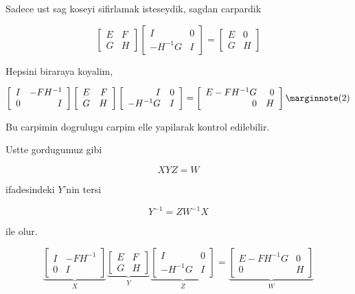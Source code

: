 \documentclass[12pt,fleqn]{article}\usepackage{../common}
\begin{document}
Sadece ust sag koseyi sifirlamak isteseydik, sagdan carpardik

\[ 
\left[\begin{array}{rr}
E & F \\
G & H
\end{array}\right] 
\left[\begin{array}{rr}
I & 0 \\
-H^{-1}G & I
\end{array}\right] 
=
\left[\begin{array}{rr}
E & 0 \\
G & H
\end{array}\right] 
 \]

Hepsini biraraya koyalim, 

\[ 
\left[\begin{array}{rr}
I & -FH^{-1} \\
0 & I
\end{array}\right] 
\left[\begin{array}{rr}
E & F \\
G & H
\end{array}\right] 
\left[\begin{array}{rr}
I & 0 \\
-H^{-1}G & I
\end{array}\right] 
= 
\left[\begin{array}{rr}
E-FH^{-1}G & 0 \\
0 & H
\end{array}\right] 
\mlabel{2}
 \]

Bu carpimin dogrulugu carpim elle yapilarak kontrol edilebilir.

Ustte gordugumuz gibi 

\[ XYZ = W \]

ifadesindeki $Y$'nin tersi 

\[ Y^{-1} = ZW^{-1}X \]

ile olur. 

\[ 
\underbrace{
\left[\begin{array}{rr}
I & -FH^{-1} \\
0 & I
\end{array}\right] 
}_{X}
\underbrace{
\left[\begin{array}{rr}
E & F \\
G & H
\end{array}\right] 
}_{Y}
\underbrace{
\left[\begin{array}{rr}
I & 0 \\
-H^{-1}G & I
\end{array}\right] 
}_{Z}
= 
\underbrace{
\left[\begin{array}{rr}
E-FH^{-1}G & 0 \\
0 & H
\end{array}\right] 
}_{W}
 \]
\end{document}

